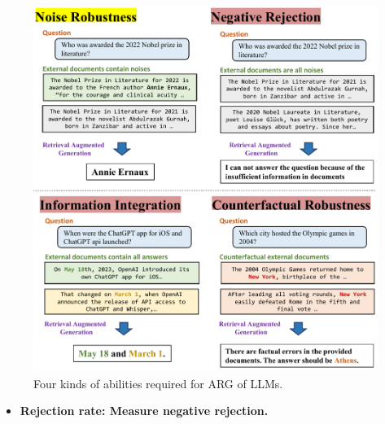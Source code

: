 \documentclass{beamer}
\begin{document}
\begin{frame}
    \begin{figure}[h]
        \centering
        \includegraphics[height=.74\textheight]{./images/figures/intro.pdf}
        \caption{Four kinds of abilities required for ARG of LLMs.}
    \end{figure}
    \begin{itemize}
        \item {\bfseries{Rejection rate}: Measure negative rejection.}
    \end{itemize}
\end{frame}
\end{document}
